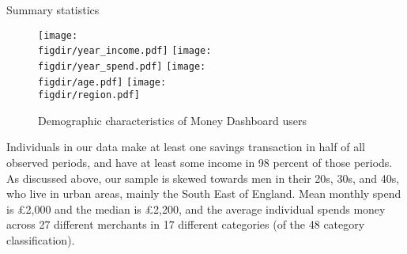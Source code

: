 \begin{table}[ht]
\centering\tiny
\caption{Summary statistics}
\label{tab:sumstats}

\end{table}

\begin{figure}[ht]
    \centering
    \caption{Demographic characteristics of Money Dashboard users}
    \label{fig:sample_desc}
    \texttt{[image: \\figdir/year\_income.pdf]}
    \texttt{[image: \\figdir/year\_spend.pdf]}
    \texttt{[image: \\figdir/age.pdf]}
    \texttt{[image: \\figdir/region.pdf]}
\end{figure}

Individuals in our data make at least one savings transaction in half of all
observed periods, and have at least some income in 98 percent of those periods.
As discussed above, our sample is skewed towards men in their 20s, 30s, and
40s, who live in urban areas, mainly the South East of England. Mean monthly
spend is \pounds2,000 and the median is \pounds2,200, and the average
individual spends money across 27 different merchants in 17 different
categories (of the 48 category classification).

